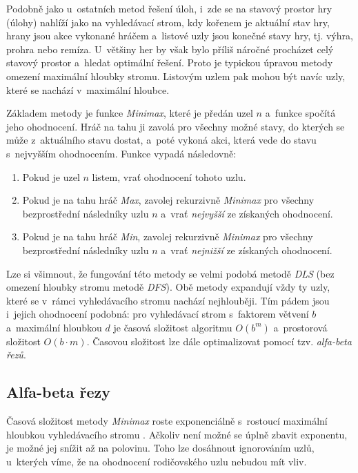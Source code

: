 Podobně jako u~ostatních metod řešení úloh, i~zde se na stavový prostor hry (úlohy) nahlíží jako na vyhledávací strom, kdy kořenem je aktuální stav hry, hrany jsou akce vykonané hráčem a~listové uzly jsou konečné stavy hry, tj. výhra, prohra nebo remíza. U~většiny her by však bylo příliš náročné procházet celý stavový prostor a~hledat optimální řešení. Proto je typickou úpravou metody omezení maximální hloubky stromu. Listovým uzlem pak mohou být navíc uzly, které se nachází v~maximální hloubce.

Základem metody je funkce \emph{Minimax}, které je předán uzel $n$ a~funkce spočítá jeho ohodnocení. Hráč na tahu ji zavolá pro všechny možné stavy, do kterých se může z~aktuálního stavu dostat, a~poté vykoná akci, která vede do stavu s~nejvyšším ohodnocením. Funkce vypadá následovně:
\begin{enumerate}
    \item Pokud je uzel $n$ listem, vrať ohodnocení tohoto uzlu.
    \item Pokud je na tahu hráč \emph{Max}, zavolej rekurzivně \emph{Minimax} pro všechny bezprostřední následníky uzlu $n$ a~vrať \emph{nejvyšší} ze získaných ohodnocení.
    \item Pokud je na tahu hráč \emph{Min}, zavolej rekurzivně \emph{Minimax} pro všechny bezprostřední následníky uzlu $n$ a~vrať \emph{nejnižší} ze získaných ohodnocení.
\end{enumerate}

Lze si všimnout, že fungování této metody se velmi podobá metodě \emph{DLS} (bez omezení hloubky stromu metodě \emph{DFS}). Obě metody expandují vždy ty uzly, které se v~rámci vyhledávacího stromu nachází nejhlouběji. Tím pádem jsou i~jejich ohodnocení podobná: pro vyhledávací strom s~faktorem větvení $b$ a~maximální hloubkou $d$ je časová složitost algoritmu $O(b^m)$ a~prostorová složitost $O(b \cdot m)$. Časovou složitost lze dále optimalizovat pomocí tzv. \emph{alfa-beta řezů}.

\subsection*{Alfa-beta řezy}

Časová složitost metody \emph{Minimax} roste exponenciálně s~rostoucí maximální hloubkou vyhledávacího stromu \cite{AI_Russel_Norvig}. Ačkoliv není možné se úplně zbavit exponentu, je možné jej snížit až na polovinu. Toho lze dosáhnout ignorováním uzlů, u~kterých víme, že na ohodnocení rodičovského uzlu nebudou mít vliv.

